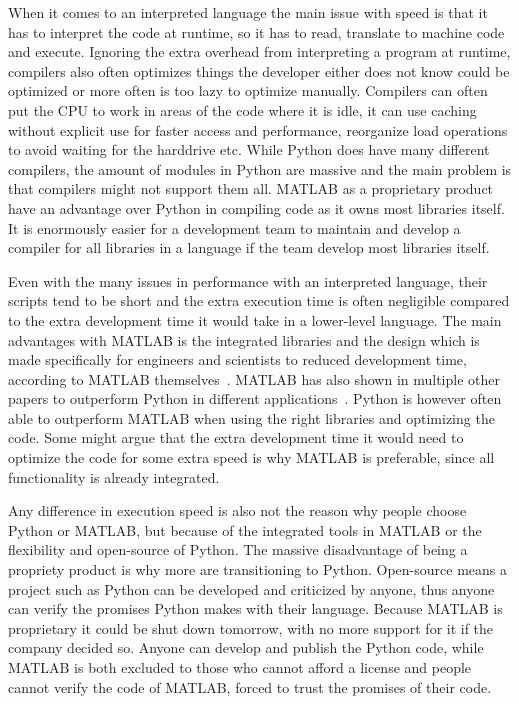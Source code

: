 \documentclass[12pt, a4paper]{article}
\begin{document}
When it comes to an interpreted language the main issue with speed is that it has to interpret the code at runtime, so it has to read, translate to machine code and execute.
Ignoring the extra overhead from interpreting a program at runtime, compilers also often optimizes things the developer either does not know could be optimized or more often is too lazy to optimize manually.
Compilers can often put the CPU to work in areas of the code where it is idle, it can use caching without explicit use for faster access and performance, reorganize load operations to avoid waiting for the harddrive etc. 
While Python does have many different compilers, the amount of modules in Python are massive and the main problem is that compilers might not support them all.
MATLAB as a proprietary product have an advantage over Python in compiling code as it owns most libraries itself.
It is enormously easier for a development team to maintain and develop a compiler for all libraries in a language if the team develop most libraries itself. 

Even with the many issues in performance with an interpreted language, their scripts tend to be short and the extra execution time is often negligible compared to the extra development time it would take in a lower-level language.
The main advantages with MATLAB is the integrated libraries and the design  which is made specifically for engineers and scientists to reduced development time, according to MATLAB themselves~\cite{WhyMatlab}. 
MATLAB has also shown in multiple other papers to outperform Python in different applications~\cite{EMMatVsPy, ARUOBA2015265}.
Python is however often able to outperform MATLAB when using the right libraries and optimizing the code.
Some might argue that the extra development time it would need to optimize the code for some extra speed is why MATLAB is preferable, since all functionality is already integrated.

Any difference in execution speed is also not the reason why people choose Python or MATLAB, but because of the integrated tools in MATLAB or the flexibility and open-source of Python.
The massive disadvantage of being a propriety product is why more are transitioning to Python.
Open-source means a project such as Python can be developed and criticized by anyone, thus anyone can verify the promises Python makes with their language.
Because MATLAB is proprietary it could be shut down tomorrow, with no more support for it if the company decided so.
Anyone can develop and publish the Python code, while MATLAB is both excluded to those who cannot afford a license and people cannot verify the code of MATLAB, forced to trust the promises of their code.
\end{document}
